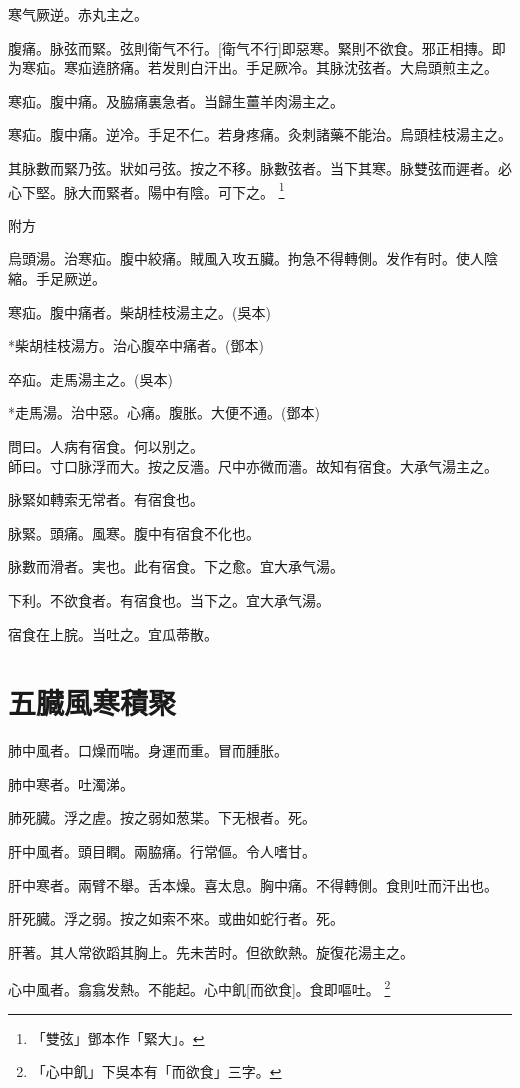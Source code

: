 \documentclass[12pt,twoside,UTF8,b5paper]{ctexbook}
\begin{document}
寒气厥逆。赤丸主之。

腹痛。脉弦而緊。弦則衛气不行。[衛气不行]即惡寒。緊則不欲食。邪正相摶。即为寒疝。寒疝遶脐痛。若发則白汗出。手足厥冷。其脉沈弦者。大烏頭煎主之。

寒疝。腹中痛。及脇痛裏急者。当歸生薑羊肉湯主之。

寒疝。腹中痛。逆冷。手足不仁。若身疼痛。灸刺諸藥不能治。烏頭桂枝湯主之。

其脉數而緊乃弦。狀如弓弦。按之不移。脉數弦者。当下其寒。脉雙弦而遲者。必心下堅。脉大而緊者。陽中有陰。可下之。
	\footnote{「雙弦」鄧本作「緊大」。}

附方

烏頭湯。治寒疝。腹中絞痛。賊風入攻五臟。拘急不得轉側。发作有时。使人陰縮。手足厥逆。

寒疝。腹中痛者。柴胡桂枝湯主之。(吳本)

*柴胡桂枝湯方。治心腹卒中痛者。(鄧本)

卒疝。走馬湯主之。(吳本)

*走馬湯。治中惡。心痛。腹胀。大便不通。(鄧本)

問曰。人病有宿食。何以别之。\\
師曰。寸口脉浮而大。按之反濇。尺中亦微而濇。故知有宿食。大承气湯主之。

脉緊如轉索无常者。有宿食也。

脉緊。頭痛。風寒。腹中有宿食不化也。

脉數而滑者。実也。此有宿食。下之愈。宜大承气湯。

下利。不欲食者。有宿食也。当下之。宜大承气湯。

宿食在上脘。当吐之。宜瓜蒂散。

\chapter{五臓風寒積聚}

肺中風者。口燥而喘。身運而重。冒而腫胀。

肺中寒者。吐濁涕。

肺死臓。浮之虗。按之弱如葱枼。下无根者。死。

肝中風者。頭目瞤。兩脇痛。行常傴。令人嗜甘。

肝中寒者。兩臂不舉。舌本燥。喜太息。胸中痛。不得轉側。食則吐而汗出也。

肝死臓。浮之弱。按之如索不來。或曲如蛇行者。死。

肝著。其人常欲蹈其胸上。先未苦时。但欲飲熱。旋復花湯主之。

心中風者。翕翕发熱。不能起。心中飢[而欲食]。食即嘔吐。
	\footnote{「心中飢」下吳本有「而欲食」三字。}
\end{document}
